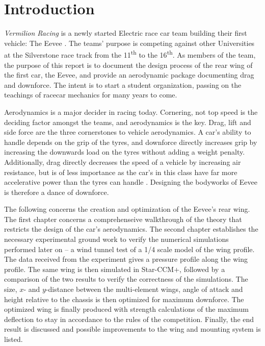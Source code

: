\chapter{Introduction}

\emph{Vermilion Racing} is a newly started Electric race car team building their first vehicle: The Eevee \cite{bulba}. The teams' purpose is competing against other Universities at the Silverstone race track from the 11\textsuperscript{th} to the 16\textsuperscript{th}. As members of the team, the purpose of this report is to document the design process of the rear wing of the first car, the Eevee, and provide an aerodynamic package documenting drag and downforce. The intent is to start a student organization, passing on the teachings of racecar mechanics for many years to come.

Aerodynamics is a major decider in racing today. Cornering, not top speed is the deciding factor amongst the teams, and aerodynamics is the key. Drag, lift and side force are the three cornerstones to vehicle aerodynamics. A car's ability to handle depends on the grip of the tyres, and downforce directly increases grip by increasing the downwards load on the tyres without adding a weight penalty. Additionally, drag directly decreases the speed of a vehicle by increasing air resistance, but is of less importance as the car's in this class have far more accelerative power than the tyres can handle \cite{jkatz}. Designing the bodyworks of Eevee is therefore a dance of downforce.

The following concerns the creation and optimization of the Eevee's rear wing. The first chapter concerns a comprehenseive walkthrough of the theory that restricts the design of the car's aerodynamics. The second chapter establishes the necessary experimental ground work to verify the numerical simulations performed later on -- a wind tunnel test of a 1/4 scale model of the wing profile. The data received from the experiment gives a pressure profile along the wing profile. The same wing is then simulated in Star-CCM+, followed by a comparison of the two results to verify the correctness of the simulations. The size, $x$- and $y$-distance between the multi-element wings, angle of attack and height relative to the chassis is then optimized for maximum downforce. The optimized wing is finally produced with strength calculations of the maximum deflection to stay in accordance to the rules of the competition. Finally, the end result is discussed and possible improvements to the wing and mounting system is listed. 



